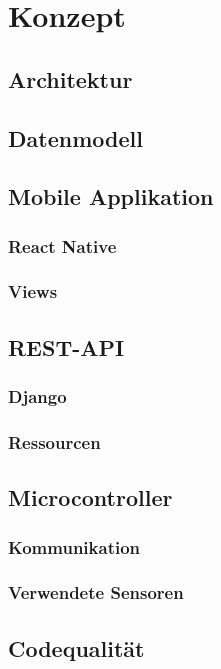 \section{Konzept}

    \subsection{Architektur}
    \subsection{Datenmodell}
    
    \subsection{Mobile Applikation}

        \subsubsection{React Native}
        \subsubsection{Views}

    \subsection{REST-API}

        \subsubsection{Django}
        \subsubsection{Ressourcen}

    \subsection{Microcontroller}

        \subsubsection{Kommunikation}
        \subsubsection{Verwendete Sensoren}

    \subsection{Codequalität}